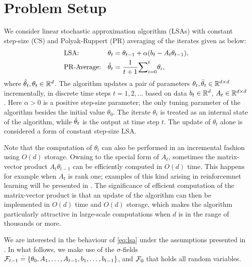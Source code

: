 \section{Problem Setup}\label{sec:prob}
We consider linear stochastic approximation algorithm (LSAs) with constant step-size (CS) and Polyak-Ruppert (PR) averaging of the iterates given as below:
\begin{subequations}\label{eq:lsa}
\begin{align}
\label{conststep}&\text{LSA:} &\theta_t&=\theta_{t-1}+\alpha(b_t-A_t\theta_{t-1}),\\
\label{iteravg}&\text{PR-Average:} &\hat{\theta}_t&=\frac{1}{t+1}{\sum}_{i=0}^{t}\theta_i,
\end{align}
\end{subequations}
where $\hat{\theta}_t, \theta_t \in \mathbb{R}^{d}$. The algorithm updates a pair of parameters $\theta_t,\bar{\theta}_t\in \mathbb{R}^{d \times d}$ incrementally, in discrete time steps $t=1,2,\dots$
based on data $b_t\in \mathbb{R}^d$, $A_t\in \mathbb{R}^{d \times d}$. Here $\alpha>0$ is a positive step-size parameter; the only tuning parameter of the algorithm besides the
initial value $\theta_0$. The iterate $\theta_t$ is treated as an internal state of the algorithm, while $\hat{\theta}_t$ is the output at time step $t$. The update of $\theta_t$ alone is considered a form of constant step-size LSA.\par
Note that the computation of $\theta_t$ can also be performed in an incremental fashion using $O(d)$ storage. Owning to the special form of $A_t$, sometimes the matrix-vector product $A_t \theta_{t-1}$ can be efficiently computed in $O(d)$ time. This happens for example when $A_t$ is rank one; examples of this kind arising in reinforcemnet learning \cite{sutton,konda-tsitsiklis,gtd,gtd2,gtdmp} will be presented in . The significance of efficient computation of the matrix-vector product is that an update of the algorithm
can then be implemented in $O(d)$ time and $O(d)$ storage, which makes the algorithm particularly attractive in large-scale computations when $d$ is in the range of thousands or more.\par
We are interested in the behaviour of \eqref{eq:lsa} under the assumptions presented in . In what follows, we make use of the $\sigma$-fields $\mathcal{F}_{t-1}\stackrel{\cdot}{=}\{\theta_0,A_1,\ldots, A_{t-1}, b_1,\ldots, b_{t-1}\}$, and $\mathcal{F}_0$ that holds all random variables.
